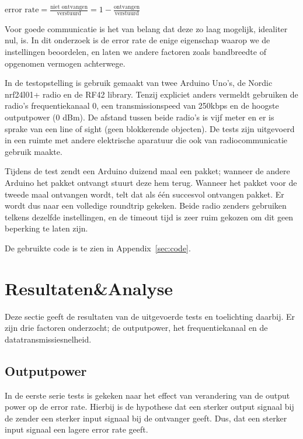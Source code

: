 \documentclass[a4paper,10pt]{article}
\begin{document}
\begin{math}
    \text{error rate} = \frac{\text{niet ontvangen}}{\text{verstuurd}} = 1 - \frac{\text{ontvangen}}{\text{verstuurd}} 
\end{math}

Voor goede communicatie is het van belang dat deze zo laag mogelijk, idealiter nul, is. In dit onderzoek is de error rate de enige eigenschap waarop we de instellingen beoordelen, en laten we andere factoren zoals bandbreedte of opgenomen vermogen achterwege.

In de testopstelling is gebruik gemaakt van twee Arduino Uno's, de Nordic nrf24l01+ radio en de RF42 library. Tenzij expliciet anders vermeldt gebruiken de radio's frequentiekanaal 0, een transmissionspeed van 250kbps en de hoogste outputpower (0 dBm). De afstand tussen beide radio's is vijf meter en er is sprake van een line of sight (geen blokkerende objecten). De tests zijn uitgevoerd in een ruimte met andere elektrische aparatuur die ook van radiocommunicatie gebruik maakte.

Tijdens de test zendt een Arduino duizend maal een pakket; wanneer de andere Arduino het pakket ontvangt stuurt deze hem terug. Wanneer het pakket voor de tweede maal ontvangen wordt, telt dat als \'e\'en succesvol ontvangen pakket. Er wordt dus naar een volledige roundtrip gekeken. Beide radio zenders gebruiken telkens dezelfde instellingen, en de timeout tijd is zeer ruim gekozen om dit geen beperking te laten zijn.

De gebruikte code is te zien in Appendix~\ref{sec:code}.

\section{Resultaten\&Analyse}
Deze sectie geeft de resultaten van de uitgevoerde tests en toelichting daarbij. Er zijn drie factoren onderzocht; de outputpower, het frequentiekanaal en de datatransmissiesnelheid.

\subsection{Outputpower}
In de eerste serie tests is gekeken naar het effect van verandering van de output power op de error rate. Hierbij is de hypothese dat een sterker output signaal bij de zender een sterker input signaal bij de ontvanger geeft. Dus, dat een sterker input signaal een lagere error rate geeft.
\end{document}

